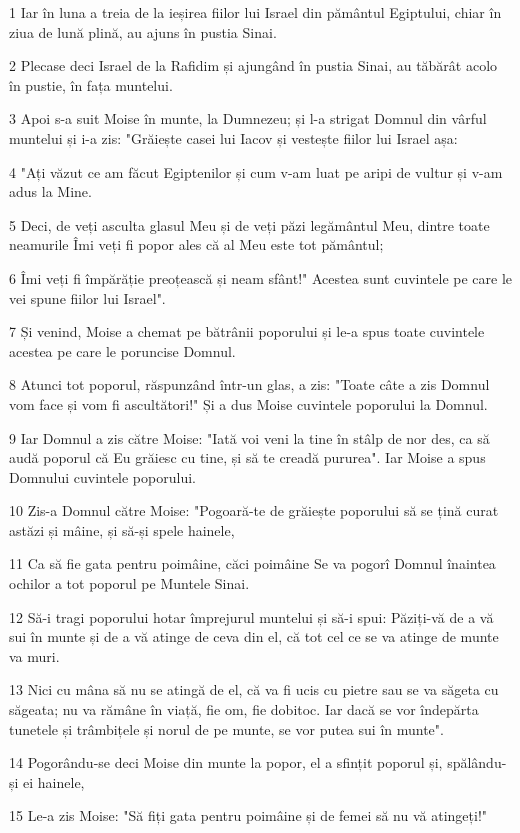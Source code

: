 \par 1 Iar în luna a treia de la ieșirea fiilor lui Israel din pământul Egiptului, chiar în ziua de lună plină, au ajuns în pustia Sinai.
\par 2 Plecase deci Israel de la Rafidim și ajungând în pustia Sinai, au tăbărât acolo în pustie, în fața muntelui.
\par 3 Apoi s-a suit Moise în munte, la Dumnezeu; și l-a strigat Domnul din vârful muntelui și i-a zis: "Grăiește casei lui Iacov și vestește fiilor lui Israel așa:
\par 4 "Ați văzut ce am făcut Egiptenilor și cum v-am luat pe aripi de vultur și v-am adus la Mine.
\par 5 Deci, de veți asculta glasul Meu și de veți păzi legământul Meu, dintre toate neamurile Îmi veți fi popor ales că al Meu este tot pământul;
\par 6 Îmi veți fi împărăție preoțească și neam sfânt!" Acestea sunt cuvintele pe care le vei spune fiilor lui Israel".
\par 7 Și venind, Moise a chemat pe bătrânii poporului și le-a spus toate cuvintele acestea pe care le poruncise Domnul.
\par 8 Atunci tot poporul, răspunzând într-un glas, a zis: "Toate câte a zis Domnul vom face și vom fi ascultători!" Și a dus Moise cuvintele poporului la Domnul.
\par 9 Iar Domnul a zis către Moise: "Iată voi veni la tine în stâlp de nor des, ca să audă poporul că Eu grăiesc cu tine, și să te creadă pururea". Iar Moise a spus Domnului cuvintele poporului.
\par 10 Zis-a Domnul către Moise: "Pogoară-te de grăiește poporului să se țină curat astăzi și mâine, și să-și spele hainele,
\par 11 Ca să fie gata pentru poimâine, căci poimâine Se va pogorî Domnul înaintea ochilor a tot poporul pe Muntele Sinai.
\par 12 Să-i tragi poporului hotar împrejurul muntelui și să-i spui: Păziți-vă de a vă sui în munte și de a vă atinge de ceva din el, că tot cel ce se va atinge de munte va muri.
\par 13 Nici cu mâna să nu se atingă de el, că va fi ucis cu pietre sau se va săgeta cu săgeata; nu va rămâne în viață, fie om, fie dobitoc. Iar dacă se vor îndepărta tunetele și trâmbițele și norul de pe munte, se vor putea sui în munte".
\par 14 Pogorându-se deci Moise din munte la popor, el a sfințit poporul și, spălându-și ei hainele,
\par 15 Le-a zis Moise: "Să fiți gata pentru poimâine și de femei să nu vă atingeți!"
